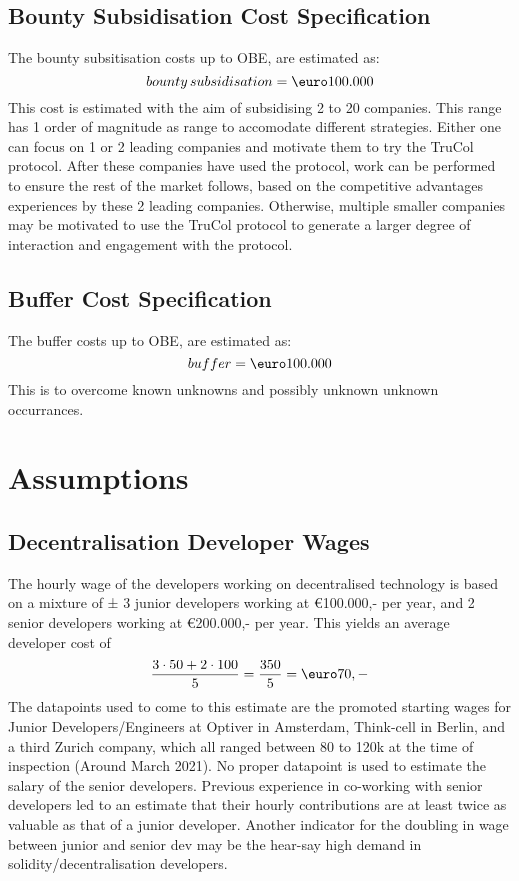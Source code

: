 \subsection{Bounty Subsidisation Cost Specification}\label{subsec:bounty_subsidisation_cost_specification}
The bounty subsitisation costs up to OBE, are estimated as:
\begin{equation}
	{bounty\, subsidisation}=\text{\euro}100.000
	\label{eq:bounty_subsidisation}
\end{equation}
This cost is estimated with the aim of subsidising 2 to 20 companies. This range has 1 order of magnitude as range to accomodate different strategies. Either one can focus on 1 or 2 leading companies and motivate them to try the TruCol protocol. After these companies have used the protocol, work can be performed to ensure the rest of the market follows, based on the competitive advantages experiences by these 2 leading companies. Otherwise, multiple smaller companies may be motivated to use the TruCol protocol to generate a larger degree of interaction and engagement with the protocol.

\subsection{Buffer Cost Specification}\label{subsec:buffer_cost_specification}
The buffer costs up to OBE, are estimated as:
\begin{equation}
	buffer=\text{\euro}100.000
	\label{eq:buffer_costs}
\end{equation}
This is to overcome known unknowns and possibly unknown unknown occurrances.

\section{Assumptions}\label{sec:assumptions}
\subsection{Decentralisation Developer Wages}
The hourly wage of the developers working on decentralised technology is based on a mixture of ± 3 junior developers working at \euro 100.000,- per year, and 2 senior developers working at \euro 200.000,- per year. This yields an average developer cost of
\begin{equation}
	\frac{3\cdot 50+2\cdot 100}{5}=\frac{350}{5}=\textup{\euro}70,-
\end{equation}
The datapoints used to come to this estimate are the promoted starting wages for Junior Developers/Engineers at Optiver in Amsterdam, Think-cell in Berlin, and a third Zurich company, which all ranged between 80 to 120k at the time of inspection (Around March 2021). No proper datapoint is used to estimate the salary of the senior developers. Previous experience in co-working with senior developers led to an estimate that their hourly contributions are at least twice as valuable as that of a junior developer. Another indicator for the doubling in wage between junior and senior dev may be the hear-say high demand in solidity/decentralisation developers.

